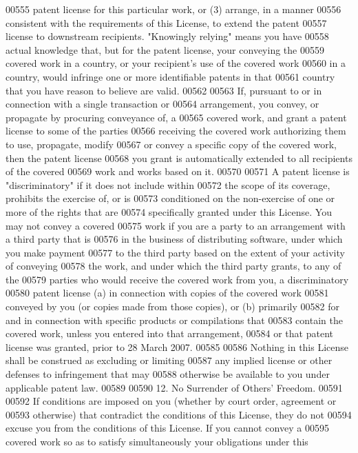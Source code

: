 \begin{DoxyCode}
00555 patent license for this particular work, or (3) arrange, in a manner
00556 consistent with the requirements of this License, to extend the patent
00557 license to downstream recipients.  "Knowingly relying" means you have
00558 actual knowledge that, but for the patent license, your conveying the
00559 covered work in a country, or your recipient's use of the covered work
00560 in a country, would infringe one or more identifiable patents in that
00561 country that you have reason to believe are valid.
00562 
00563   If, pursuant to or in connection with a single transaction or
00564 arrangement, you convey, or propagate by procuring conveyance of, a
00565 covered work, and grant a patent license to some of the parties
00566 receiving the covered work authorizing them to use, propagate, modify
00567 or convey a specific copy of the covered work, then the patent license
00568 you grant is automatically extended to all recipients of the covered
00569 work and works based on it.
00570 
00571   A patent license is "discriminatory" if it does not include within
00572 the scope of its coverage, prohibits the exercise of, or is
00573 conditioned on the non-exercise of one or more of the rights that are
00574 specifically granted under this License.  You may not convey a covered
00575 work if you are a party to an arrangement with a third party that is
00576 in the business of distributing software, under which you make payment
00577 to the third party based on the extent of your activity of conveying
00578 the work, and under which the third party grants, to any of the
00579 parties who would receive the covered work from you, a discriminatory
00580 patent license (a) in connection with copies of the covered work
00581 conveyed by you (or copies made from those copies), or (b) primarily
00582 for and in connection with specific products or compilations that
00583 contain the covered work, unless you entered into that arrangement,
00584 or that patent license was granted, prior to 28 March 2007.
00585 
00586   Nothing in this License shall be construed as excluding or limiting
00587 any implied license or other defenses to infringement that may
00588 otherwise be available to you under applicable patent law.
00589 
00590   12. No Surrender of Others' Freedom.
00591 
00592   If conditions are imposed on you (whether by court order, agreement or
00593 otherwise) that contradict the conditions of this License, they do not
00594 excuse you from the conditions of this License.  If you cannot convey a
00595 covered work so as to satisfy simultaneously your obligations under this

\end{DoxyCode}
